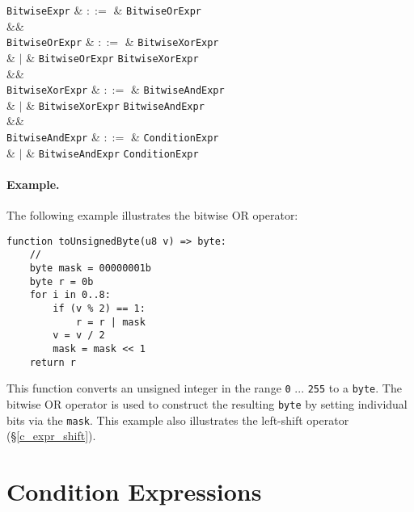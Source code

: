 \begin{syntax}
  \verb+BitwiseExpr+ & $::=$ & \verb+BitwiseOrExpr+ \\
  &&\\
  \verb+BitwiseOrExpr+ & $::=$ & \verb+BitwiseXorExpr+ \\
                           & $|$ & \verb+BitwiseOrExpr+ \token{|} \verb+BitwiseXorExpr+\\
  &&\\
  \verb+BitwiseXorExpr+ & $::=$ & \verb+BitwiseAndExpr+ \\
                            & $|$ & \verb+BitwiseXorExpr+ \token{\^} \verb+BitwiseAndExpr+\\
  &&\\
  \verb+BitwiseAndExpr+ & $::=$ & \verb+ConditionExpr+ \\
                            & $|$ & \verb+BitwiseAndExpr+ \token{\&\&} \verb+ConditionExpr+\\

\end{syntax}

\paragraph{Example.}  The following example illustrates the bitwise OR operator:

\begin{lstlisting}
function toUnsignedByte(u8 v) => byte:
    //
    byte mask = 00000001b
    byte r = 0b
    for i in 0..8:
        if (v % 2) == 1:
            r = r | mask
        v = v / 2
        mask = mask << 1
    return r  
\end{lstlisting}

This function converts an unsigned integer in the range \lstinline{0} ... \lstinline{255} to a \lstinline{byte}.  The bitwise OR operator is used to construct the resulting \lstinline{byte} by setting individual bits via the \lstinline{mask}.  This example also illustrates the left-shift operator (\S\ref{c_expr_shift}).


\section{Condition Expressions}
\label{c_expr_condition}

